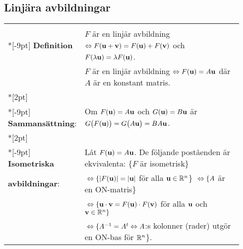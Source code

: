 \documentclass{article}
\begin{document}
\subsection*{Linjära avbildningar}%

\begin{tabular}{|p{0.2\linewidth}|p{0.745\linewidth}|}
  \hline & \\*[-9pt]
  \textbf{Definition}
  &
  $F$ är en linjär avbildning $\Leftrightarrow F({\mathbf u}+\mathbf v)=F({\mathbf u})+F({\mathbf v})$ och $F(\lambda{\mathbf u})=\lambda F({\mathbf u})$.\\
  &$F$ är en linjär avbildning $\Leftrightarrow F({\mathbf u})=A{\mathbf u}$ där $A$ är en
  konstant matris.
  \\*[2pt] \hline & \\*[-9pt]
  \textbf{Sammansättning}:
  &
  Om $F({\mathbf u})=A{\mathbf u}$ och
  $G({\mathbf u})=B{\mathbf u}$ är
  $G\bigl(F({\mathbf u})\bigr)
  =G\bigl(A{\mathbf u}\bigr)
  =BA{\mathbf u}
  $.
  \\*[2pt] \hline & \\*[-9pt]
  \textbf{Isometriska}
  & Låt $F({\mathbf u})=A{\mathbf u}$. De följande poståenden är ekvivalenta: \{$F$ är isometrisk\}\\
  \textbf{avbildningar}:
  &
   ${}\Leftrightarrow\{|F({\mathbf u})|=|{\mathbf u}|$ för alla ${\mathbf u}\in{\mathbb R}^n$\}
   ${}\Leftrightarrow \{A$ är en ON-matris\}
  \\
  &
  ${}\Leftrightarrow\{{\mathbf u}\cdot{\mathbf v}=F({\mathbf u})\cdot F({\mathbf v})$ för alla ${\mathbf u}$ och ${\mathbf v}\in{\mathbb R}^n\}$
  \\ 
  &
  ${}\Leftrightarrow\{A^{-1}=A^t\Leftrightarrow A$:s kolonner (rader) utgör en ON-bas för ${\mathbb R}^n$\}.\\
  \hline
\end{tabular}%
\end{document}
